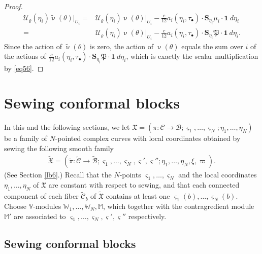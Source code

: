 \documentclass[12pt,a4paper,notitlepage]{article}
\theoremstyle{definition}
\theoremstyle{plain}
\newcommand{\fk}{\mathfrak}
\newcommand{\mc}{\mathcal}
\newcommand{\wtd}{\widetilde}
\newcommand{\id}{\mathbf{1}}
\newcommand{\sgm}{\varsigma}
\newcommand{\blt}{\bullet}
\newcommand{\Vbb}{\mathbb V}
\newcommand{\Wbb}{\mathbb W}
\newcommand{\Mbb}{\mathbb M}
\newcommand{\Sbf}{\mathbf{S}}
\numberwithin{equation}{section}
\begin{document}
\begin{proof}
	\begin{align*}
	\mc U_\varrho(\eta_i)\wtd\upnu(\theta)|_{U_i}=&\mc U_\varrho(\eta_i)\upnu(\theta)|_{U_i}-\frac{c}{12} a_i(\eta_i,\tau_\blt)\cdot\Sbf_{\eta_i}\mu_i\cdot \id~d{\eta_i}\\
	=&\mc U_\varrho(\eta_i)\upnu(\theta)|_{U_i}-\frac{c}{12} a_i(\eta_i,\tau_\blt)\cdot\Sbf_{\eta_i}\fk P\cdot \id~d{\eta_i}.
	\end{align*}
	Since the action of $\wtd\upnu(\theta)$ is zero, the action of $\upnu(\theta)$ equals the sum over $i$ of the actions of $\frac{c}{12} a_i(\eta_i,\tau_\blt)\cdot\Sbf_{\eta_i}\fk P\cdot \id~d{\eta_i}$, which is exactly the scalar multiplication by \eqref{eq56}.
\end{proof}





\section{Sewing conformal blocks}\label{lb35}


In this and the following sections, we let $\fk X=(\pi:\mc C\rightarrow\mc B;\sgm_1,\dots,\sgm_N;\eta_1,\dots,\eta_N)$ be a family of $N$-pointed complex curves with local coordinates obtained by sewing the following smooth family
\begin{align*}
\wtd{\fk X}=(\wtd\pi:\wtd{\mc C}\rightarrow\wtd{\mc B};\sgm_1,\dots,\sgm_N,\sgm',\sgm'';\eta_1,\dots,\eta_N,\xi,\varpi).
\end{align*}
(See Section \ref{lb6}.) Recall that the $N$-points  $\sgm_1,\dots,\sgm_N$ and the local coordinates $\eta_1,\dots,\eta_N$ of $\fk X$ are constant with respect to sewing, and that each connected component of each fiber $\wtd{\mc C}_b$ of $\wtd{\fk X}$ contains at least one $\sgm_1(b),\dots,\sgm_N(b)$. Choose $\Vbb$-modules $\Wbb_1,\dots,\Wbb_N,\Mbb$, which together with the contragredient module $\Mbb'$ are associated to $\sgm_1,\dots,\sgm_N,\sgm',\sgm''$ respectively. 




\subsection*{Sewing conformal blocks}
\end{document}
